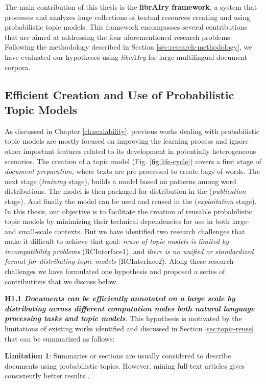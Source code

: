 The main contribution of this thesis is the \textbf{librAIry framework}, a system that processes and analyzes huge collections of textual resources creating and using probabilistic topic models. This framework encompasses several contributions that are aimed at addressing the four aforementioned research problems. Following the methodology described in Section \ref{sec:research-methodology}, we have evaluated our hypotheses using \textit{librAIry} for large multilingual document corpora. 

\subsection{Efficient Creation and Use of Probabilistic Topic Models}

As discussed in Chapter \ref{ch:scalability}, previous works dealing with probabilistic topic models are mostly focused on improving the learning process and ignore other important features related to its development in potentially heterogeneous scenarios. The creation of a topic model (Fig. \ref{fig:life-cycle}) covers a first stage of \textit{document preparation}, where texts are pre-processed to create bags-of-words. The next stage (\textit{training} stage),  builds a model based on patterns among word distributions. The model is then packaged for distribution in the (\textit{publication} stage). And finally the model can be used and reused in the (\textit{exploitation} stage). In this thesis, our objective is to facilitate the creation of reusable probabilistic topic models by minimizing their technical dependencies for use in both large- and small-scale contexts. But we have identified two research challenges that make it difficult to achieve that goal:  \textit{reuse of topic models is limited by incompatibility problems} (RCInterface1), and \textit{there is no unified or standardized format for distributing topic models} (RCInterface2). Along these research challenges we have formulated one hypothesis and proposed a series of contributions that we discuss below.


\textbf{H1.1 \textit{Documents can be efficiently annotated on a large scale by distributing across different computation nodes both natural language processing tasks and topic models}}. This hypothesis is motivated by the limitations of existing works identified and discussed in Section \ref{sec:topic-reuse} that can be summarized as follows:

\textbf{Limitation 1}: Summaries or sections are usually considered to describe documents using probabilistic topics. However, mining full-text articles gives consistently better results \citep{Westergaard2017}.

